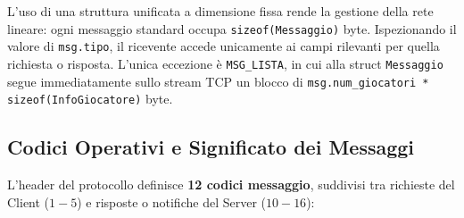 \documentclass[11pt,a4paper]{article}
\begin{document}
L'uso di una struttura unificata a dimensione fissa rende la gestione della rete lineare: ogni messaggio standard occupa \texttt{sizeof(Messaggio)} byte. Ispezionando il valore di \texttt{msg.tipo}, il ricevente accede unicamente ai campi rilevanti per quella richiesta o risposta. L'unica eccezione è \texttt{MSG\_LISTA}, in cui alla struct \texttt{Messaggio} segue immediatamente sullo stream TCP un blocco di \texttt{msg.num\_giocatori * sizeof(InfoGiocatore)} byte.

\subsection{Codici Operativi e Significato dei Messaggi}

L'header del protocollo definisce \textbf{12 codici messaggio}, suddivisi tra richieste del Client ($1 - 5$) e risposte o notifiche del Server ($10 - 16$):
\end{document}
